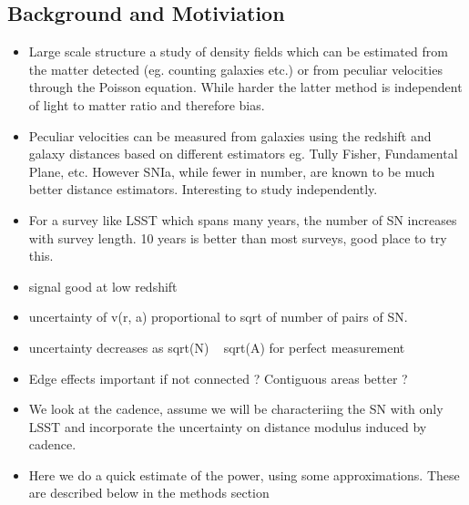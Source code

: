\subsection{Background and Motiviation}
\begin{itemize}
\item Large scale structure a study of density fields which can be estimated from the matter detected (eg. counting galaxies etc.) or from peculiar velocities through the Poisson equation. While harder the latter method is independent of light to matter ratio and therefore bias.
\item Peculiar velocities can be measured from galaxies using the redshift and galaxy distances based on different estimators eg. Tully Fisher, Fundamental Plane, etc. However SNIa, while fewer in number, are known to be much better distance estimators. Interesting to study independently.
\item For a survey like LSST which spans many years, the number of SN increases with survey length. 10 years is better than most surveys, good place to try this.
\end{itemize}

\begin{itemize}
    \item signal good at low redshift
    \item uncertainty of v(r, a) proportional to sqrt of number of pairs of SN. 
    \item uncertainty decreases as sqrt(N) ~ sqrt(A) for perfect measurement
    \item Edge effects important if not connected ? Contiguous areas better ?
    \item We look at the cadence, assume we will be characteriing the SN with only LSST and incorporate the uncertainty on distance modulus induced by cadence.
    \item Here we do a quick estimate of the power, using some approximations. These are described below in the methods section
\end{itemize}

